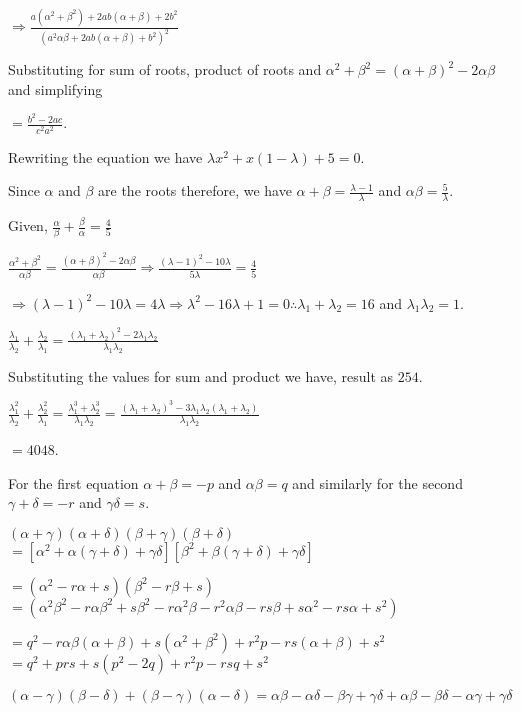   $\Rightarrow \frac{a(\alpha^2 + \beta^2) + 2ab(\alpha + \beta) + 2b^2}{(a^2\alpha\beta + 2ab(\alpha +
    \beta) + b^2)^2}$

  Substituting for sum of roots, product of roots and $\alpha^2 + \beta^2 = (\alpha + \beta)^2 -
  2\alpha\beta$ and simplifying

  $= \frac{b^2 - 2ac}{c^2a^2}$.
\item Rewriting the equation we have $\lambda x^2 + x(1 - \lambda) + 5 = 0$.

  Since $\alpha$ and $\beta$ are the roots therefore, we have $\alpha + \beta = \frac{\lambda - 1}{\lambda}$
  and $\alpha\beta = \frac{5}{\lambda}$.

  Given, $\frac{\alpha}{\beta} + \frac{\beta}{\alpha} = \frac{4}{5}$

  $\frac{\alpha^2 + \beta^2}{\alpha\beta} = \frac{(\alpha + \beta)^2 - 2\alpha\beta}{\alpha\beta}\Rightarrow
  \frac{(\lambda - 1)^2 - 10\lambda}{5\lambda} = \frac{4}{5}$

  $\Rightarrow (\lambda - 1)^2 - 10\lambda = 4\lambda \Rightarrow \lambda^2 - 16\lambda + 1 = 0\therefore
  \lambda_1 + \lambda_2 = 16$ and $\lambda_1\lambda_2 = 1$.
  \startitemize[i]
  \item $\frac{\lambda_1}{\lambda_2} + \frac{\lambda_2}{\lambda_1} = \frac{(\lambda_1 + \lambda_2)^2 -
    2\lambda_1\lambda_2}{\lambda_1\lambda_2}$

    Substituting the values for sum and product we have, result as $254$.
  \item $\frac{\lambda_1^2}{\lambda_2} + \frac{\lambda_2^2}{\lambda_1} = \frac{\lambda_1^3 +
    \lambda_2^3}{\lambda_1\lambda_2} = \frac{(\lambda_1 + \lambda_2)^3 - 3\lambda_1\lambda_2(\lambda_1 +
    \lambda_2)}{\lambda_1\lambda_2}$

    $= 4048$.
  \stopitemize
\item For the first equation $\alpha + \beta = -p$ and $\alpha\beta = q$ and similarly for the second
  $\gamma + \delta = -r$ and $\gamma\delta = s$.
  \startitemize[i]
  \item $(\alpha + \gamma)(\alpha + \delta)(\beta + \gamma)(\beta + \delta)$
    $= [\alpha^2 + \alpha(\gamma + \delta) + \gamma\delta][\beta^2 + \beta(\gamma + \delta) + \gamma\delta]$

    $= (\alpha^2 - r\alpha + s)(\beta^2 - r\beta + s)$
    $= (\alpha^2\beta^2 - r\alpha\beta^2 + s\beta^2 - r\alpha^2\beta - r^2\alpha\beta - rs\beta + s\alpha^2 - rs\alpha +
    s^2)$

    $= q^2 - r\alpha\beta(\alpha + \beta) + s(\alpha^2 + \beta^2) + r^2p - rs(\alpha + \beta) + s^2$
    $= q^2 + prs + s(p^2 - 2q) + r^2p - rsq + s^2$
  \item $(\alpha - \gamma)(\beta - \delta) + (\beta - \gamma)(\alpha - \delta) = \alpha\beta -
    \alpha\delta - \beta\gamma + \gamma\delta + \alpha\beta - \beta\delta -\alpha\gamma + \gamma\delta$

